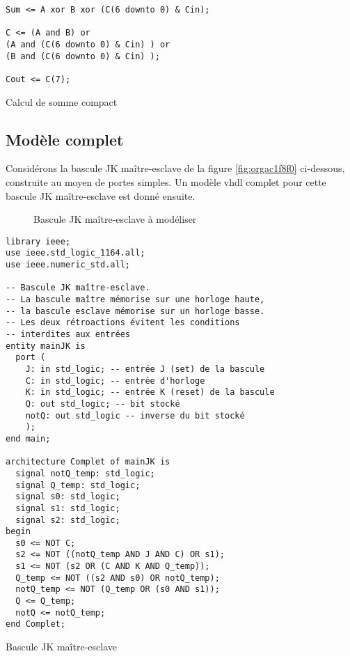 \documentclass[11pt]{article}
\begin{document}
\begin{listing}[htbp]
\begin{verbatim}
Sum <= A xor B xor (C(6 downto 0) & Cin);

C <= (A and B) or
(A and (C(6 downto 0) & Cin) ) or
(B and (C(6 downto 0) & Cin) );

Cout <= C(7);
\end{verbatim}
\caption{Calcul de somme compact}
\end{listing}

\subsection{Modèle complet}
\label{sec:org9115515}

Considérons la bascule JK maître-esclave de la figure \ref{fig:orgac1f8f0}
ci-dessous, construite au moyen de portes simples.  Un modèle
vhdl complet pour cette bascule JK maître-esclave est donné ensuite.

\begin{figure}[htbp]
\centering

\caption{\label{fig:orgb28fdab}Bascule JK maître-esclave à modéliser}
\end{figure}


\begin{listing}[htbp]
\begin{verbatim}
library ieee;
use ieee.std_logic_1164.all;
use ieee.numeric_std.all;

-- Bascule JK maître-esclave.
-- La bascule maître mémorise sur une horloge haute, 
-- la bascule esclave mémorise sur un horloge basse. 
-- Les deux rétroactions évitent les conditions 
-- interdites aux entrées 
entity mainJK is
  port (
    J: in std_logic; -- entrée J (set) de la bascule
    C: in std_logic; -- entrée d'horloge
    K: in std_logic; -- entrée K (reset) de la bascule
    Q: out std_logic; -- bit stocké
    notQ: out std_logic -- inverse du bit stocké
    );
end main;

architecture Complet of mainJK is
  signal notQ_temp: std_logic;
  signal Q_temp: std_logic;
  signal s0: std_logic;
  signal s1: std_logic;
  signal s2: std_logic;
begin
  s0 <= NOT C;
  s2 <= NOT ((notQ_temp AND J AND C) OR s1);
  s1 <= NOT (s2 OR (C AND K AND Q_temp));
  Q_temp <= NOT ((s2 AND s0) OR notQ_temp);
  notQ_temp <= NOT (Q_temp OR (s0 AND s1));
  Q <= Q_temp;
  notQ <= notQ_temp;
end Complet;
\end{verbatim}
\caption{Bascule JK maître-esclave}
\end{listing}
\end{document}
